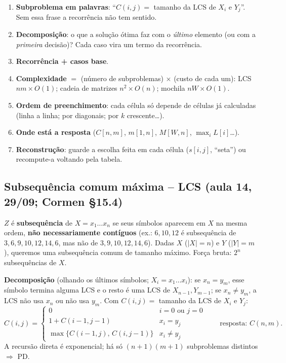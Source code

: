 \begin{prova}
\begin{enumerate}
  \item \textbf{Subproblema em palavras}: ``$C(i,j)=$ tamanho da LCS de $X_i$ e $Y_j$''. Sem essa frase a recorrência não tem sentido.
  \item \textbf{Decomposição}: o que a solução ótima faz com o \emph{último} elemento (ou com a \emph{primeira} decisão)? Cada caso vira um termo da recorrência.
  \item \textbf{Recorrência + casos base}.
  \item \textbf{Complexidade} $=$ (número de subproblemas) $\times$ (custo de cada um): LCS $nm\times O(1)$; cadeia de matrizes $n^2\times O(n)$; mochila $nW\times O(1)$.
  \item \textbf{Ordem de preenchimento}: cada célula só depende de células já calculadas (linha a linha; por diagonais; por $k$ crescente\dots).
  \item \textbf{Onde está a resposta} ($C[n,m]$, $m[1,n]$, $M[W,n]$, $\max_i L[i]$\dots).
  \item \textbf{Reconstrução}: guarde a escolha feita em cada célula ($s[i,j]$, ``seta'') ou recompute-a voltando pela tabela.
\end{enumerate}
\end{prova}

\subsection{Subsequência comum máxima -- LCS (aula 14, 29/09; Cormen §15.4)}\label{sec:lcs}
$Z$ é \textbf{subsequência} de $X=x_1\dots x_n$ se seus símbolos aparecem em $X$ na mesma ordem, \textbf{não necessariamente contíguos} (ex.: $6,10,12$ é subsequência de $3,6,9,10,12,14,6$, mas não de $3,9,10,12,14,6$). Dadas $X$ ($|X|=n$) e $Y$ ($|Y|=m$), queremos uma subsequência comum de tamanho máximo. Força bruta: $2^n$ subsequências de $X$.

\textbf{Decomposição} (olhando os últimos símbolos; $X_i=x_1\dots x_i$): se $x_n=y_m$, esse símbolo termina alguma LCS e o resto é uma LCS de $X_{n-1},Y_{m-1}$; se $x_n\ne y_m$, a LCS não usa $x_n$ ou não usa $y_m$. Com $C(i,j)=$ tamanho da LCS de $X_i$ e $Y_j$:
\[
C(i,j)=\begin{cases}0 & i=0\text{ ou }j=0\\ 1+C(i-1,j-1) & x_i=y_j\\ \max\{C(i-1,j),\,C(i,j-1)\} & x_i\ne y_j\end{cases}\qquad\text{resposta: }C(n,m).
\]
A recursão direta é exponencial; há só $(n+1)(m+1)$ subproblemas distintos $\Rightarrow$ PD.

